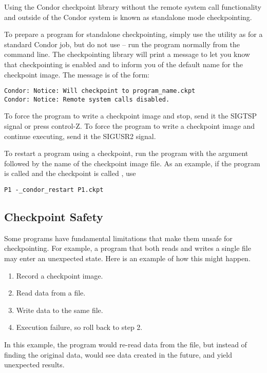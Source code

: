 Using the Condor checkpoint library without the remote system call
functionality and outside of the Condor system is known as standalone
mode checkpointing.

To prepare a program for standalone checkpointing, simply use the
 utility as for a standard Condor job, but do not
use  -- run the program normally from the command
line.  The checkpointing library will print a message to let you know
that checkpointing is enabled and to inform you of the default
name for the checkpoint image. The message is of the form:

\begin{verbatim}
Condor: Notice: Will checkpoint to program_name.ckpt
Condor: Notice: Remote system calls disabled.
\end{verbatim}

To force the program to write a checkpoint image and stop, send it
the SIGTSP signal or press control-Z.  To force the program to 
write a checkpoint image and continue executing, send it the
SIGUSR2 signal.

To restart a program using a checkpoint, run the program
with the argument
 followed by the name of the checkpoint
image file.
As an example, if the program is called  and
the checkpoint is called , use
\begin{verbatim}
P1 -_condor_restart P1.ckpt
\end{verbatim}

\subsection{\label{sec:ckpt-safety}Checkpoint Safety}

Some programs have fundamental limitations that make them
unsafe for checkpointing.  For example, a program that both reads
and writes a single file may enter an unexpected state. Here
is an example of how this might happen.

\begin{enumerate}
\item Record a checkpoint image.
\item Read data from a file.
\item Write data to the same file.
\item Execution failure, so roll back to step 2.
\end{enumerate}

In this example, the program would re-read data from the file, but
instead of finding the original data, would see data created in the
future, and yield unexpected results.

